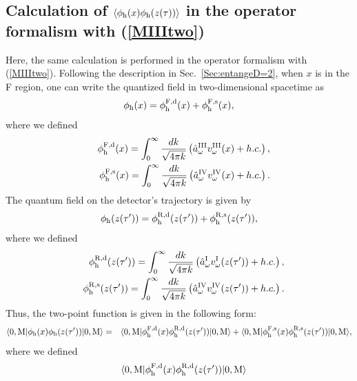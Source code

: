 \documentclass[aps,prd,preprintnumbers,nofootinbib,showpacs]{revtex4}%
\begin{document}
\begin{widetext}
\subsection{Calculation of $\langle\phi_{\rm h}(x)\phi_{\rm h}(z(\tau))\rangle$ in the operator formalism with 
(\ref{MIIItwo})}
Here, the same calculation is performed in the operator formalism with (\ref{MIIItwo}).
Following the description in Sec.~\ref{Sec:entangeD=2}, 
when $x$ is in the F region, one can write the quantized field 
in two-dimensional spacetime as 
\begin{eqnarray}
\phi_{\rm h}(x)=\phi_{\rm h}^{\rm F,d}(x)+\phi_{\rm h}^{\rm F,s}(x),
\end{eqnarray}
where we defined
\begin{eqnarray}
&&\phi_{\rm h}^{\rm F,d}(x)=\int_{0}^{\infty} {dk\over \sqrt{4\pi k}}  \left(\hat a^{\rm III}_\omega
v_\omega^{\rm III}(x) +h.c.\right),
\\
&&\phi_{\rm h}^{\rm F,s}(x)=\int_{0}^{\infty} {dk\over \sqrt{4\pi k}}  
\left(\hat a^{\rm IV}_\omega
v_\omega^{\rm IV}(x) +h.c.\right).
\end{eqnarray}
The quantum field on the detector's trajectory is given by 
\begin{eqnarray}
\phi_{\rm h}(z(\tau'))=\phi_{\rm h}^{\rm R,d}(z(\tau'))+\phi_{\rm h}^{\rm R,s}(z(\tau')),
\end{eqnarray}
where we defined
\begin{eqnarray}
&&\phi_{\rm h}^{\rm R,d}(z(\tau'))=\int_{0}^{\infty} {dk\over \sqrt{4\pi k}}  
 \left(\hat a^{\rm I}_\omega
v_\omega^{\rm I}(z(\tau')) +h.c.\right),
\\
&&\phi_{\rm h}^{\rm R,s}(z(\tau'))=\int_{0}^{\infty} {dk\over \sqrt{4\pi k}}  
 \left(\hat a^{\rm IV}_\omega
v_\omega^{\rm IV}(z(\tau')) +h.c.\right).
\end{eqnarray}
Thus, the two-point function is given in the following form:
\begin{eqnarray}
\langle 0,{\rm M}| \phi_{\rm h}(x) \phi_{\rm h} (z(\tau'))|0, {\rm M}\rangle
&=&
\langle 0,{\rm M}| \phi_{\rm h}^{\rm F,d}(x) \phi_{\rm h}^{\rm R,d}(z(\tau'))|0, {\rm M}\rangle
+\langle 0,{\rm M}| \phi_{\rm h}^{\rm F,s}(x) \phi_{\rm h}^{\rm R,s}(z(\tau'))|0, {\rm M}\rangle,
\end{eqnarray}
where we defined
\begin{eqnarray}
&&\langle 0,{\rm M}| \phi_{\rm h}^{\rm F,d}(x) \phi_{\rm h}^{\rm R,d}(z(\tau'))|0, {\rm M}\rangle

\end{eqnarray}
\end{widetext}
\end{document}
